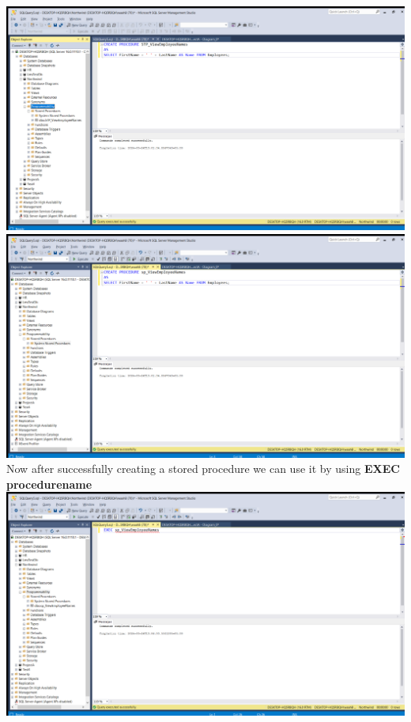 \documentclass{article}
\begin{document}
\begin{center}
    \includegraphics[width=1\textwidth]{2.png} \\
    \includegraphics[width=1\textwidth]{3.png} \\
    \newpage 
    Now after successfully creating a stored procedure we can use it by using 
 \textbf{EXEC procedurename} \\
    \includegraphics[width=1\textwidth]{4.png} \\

\end{center}
\end{document}
